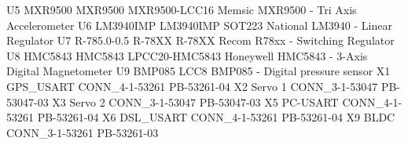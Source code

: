 \documentclass[11pt, a4paper]{article}[2009/11/13]
\begin{document}
U5      MXR9500       MXR9500           MXR9500-LCC16         Memsic MXR9500 - Tri Axis Accelerometer                                   
U6      LM3940IMP     LM3940IMP         SOT223                National LM3940 - Linear Regulator                                        
U7      R-785.0-0.5   R-78XX            R-78XX                Recom R78xx - Switching Regulator                                         
U8      HMC5843       HMC5843           LPCC20-HMC5843        Honeywell HMC5843 - 3-Axis Digital Magnetometer                           
U9                    BMP085            LCC8                  BMP085 - Digital pressure sensor                                          
X1      GPS_USART     CONN_4-1-53261    PB-53261-04                                                                                     
X2      Servo 1       CONN_3-1-53047    PB-53047-03                                                                                     
X3      Servo 2       CONN_3-1-53047    PB-53047-03                                                                                     
X5      PC-USART      CONN_4-1-53261    PB-53261-04                                                                                     
X6      DSL_USART     CONN_4-1-53261    PB-53261-04                                                                                     
X9      BLDC          CONN_3-1-53261    PB-53261-03                                                                                     
\end{document}
